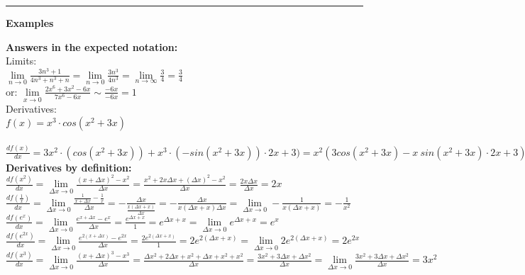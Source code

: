 \documentclass[12pt,a4paper]{report}
\begin{document}
	\rule{17cm}{1pt}
	
	\begin{center}\textbf{Examples}\end{center}
	
	\textbf{Answers in the expected notation:}\\
	Limits:\\
	$\lim\limits_{n \to 0} \frac{3n^3 + 1}{4n^3+n^3+n} = \lim\limits_{n \to 0} \frac{3n^3}{4n^3} = \lim\limits_{n \to \infty} \frac{3}{4} = \frac{3}{4}$\\
	or: $\lim\limits_{x \to 0} \frac{2x^6 + 3x^2 - 6x}{7x^6 - 6x} \sim \frac{-6x}{-6x} = 1$\\
	
	Derivatives:\\
	$f(x) = x^3 \cdot cos (x^2 + 3x)$\\\
	$\frac{df(x)}{dx} = 3x^2 \cdot (cos(x^2 + 3x)) + x^3 \cdot (-sin (x^2 + 3x)) \cdot 2x+3) = x^2 (3 cos(x^2+3x) - x \ sin(x^2 + 3x) \cdot 2x + 3)$\\
	
	\textbf{Derivatives by definition:}\\
	$\frac{df(x^2)}{dx} = \lim\limits_{\Delta x \to 0}\frac{(x+\Delta x)^2 - x^2}{\Delta x} = \frac{x^2 + 2x \Delta x+ (\Delta x)^2-x^2}{\Delta x} = \frac{2x \Delta x}{ \Delta x} = 2x$\\
	$\frac{df(\frac{1}{x})}{dx} = \lim\limits_{\Delta x \to 0} \frac{\frac{1}{x + \Delta x} - \frac{1}{x}}{\Delta x} = - \frac{\Delta x}{\frac{x (\Delta x + x)}{\Delta x}} = - \frac{\Delta x}{x (\Delta x + x) \Delta x} = \lim\limits_{\Delta x \to 0} -\frac{1}{x (\Delta x + x)} = -\frac{1}{x^2}$\\
	$\frac{df(e^x)}{dx} = \lim\limits_{\Delta x \to 0} \frac{e^{x+\Delta x} - e^x}{\Delta x} = \frac{e^{\Delta x + x}}{1} = e^{\Delta x + x} = \lim\limits_{\Delta x \to 0} e^{\Delta x + x} = e^x$\\
	$\frac{df(e^{2x})}{dx} = \lim\limits_{\Delta x \to 0} \frac{e^{2(x+\Delta x)} - e^{2x}}{\Delta x} = \frac{2e^{2(\Delta x + x)}}{1} = 2e^{2(\Delta x + x)} = \lim\limits_{\Delta x \to 0} 2e^{2(\Delta x + x)} = 2e^{2x}$\\
	$\frac{df(x^3)}{dx} = \lim\limits_{\Delta x \to 0} \frac{(x+\Delta x)^3 - x^3}{\Delta x} = \frac{\Delta x^2 + 2\Delta x + x^2 + \Delta x + x^2 + x^2}{\Delta x} = \frac{3x^2 + 3\Delta x + \Delta x^2}{\Delta x} = \lim\limits_{\Delta x \to 0} \frac{3x^2 + 3\Delta x + \Delta x^2}{\Delta x} = 3x^2$\\
	
\end{document}
